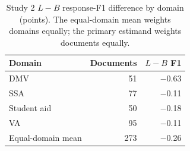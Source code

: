 \begin{table}[htbp]\centering\small
\caption{Study 2 $L-B$ response-F1 difference by domain (points). The equal-domain mean weights domains equally; the primary estimand weights documents equally.}\label{tab:domains}
\begin{tabular}{lrr}\toprule
Domain & Documents & $L-B$ F1\\\midrule
DMV & 51 & $-$0.63\\
SSA & 77 & $-$0.11\\
Student aid & 50 & $-$0.18\\
VA & 95 & $-$0.11\\
Equal-domain mean & 273 & $-$0.26\\
\bottomrule\end{tabular}\end{table}
